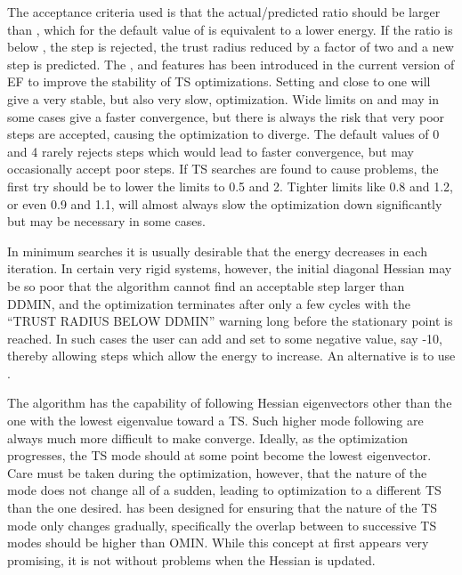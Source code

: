 \begin{enumerate}
The  acceptance criteria used is that the actual/predicted ratio should be
larger  than , which for the default   value of  is
equivalent to a lower  energy. If the ratio is below , the step is
rejected, the trust radius  reduced by a factor of two and a new step is
predicted. The ,  and   features has been
introduced in the current version of EF to improve the  stability of TS
optimizations. Setting  and  close to one will give a 
very stable, but also very slow, optimization. Wide limits on  and
 may  in some cases give a  faster convergence, but there is always
the risk that  very poor steps are accepted, causing the optimization to
diverge. The default  values of 0 and 4 rarely rejects steps which would lead
to faster convergence,  but may occasionally accept poor steps. If TS searches
are found to cause problems, the first try should be to lower the limits to 0.5
and 2. Tighter  limits like 0.8 and 1.2, or   even 0.9 and 1.1, will almost
always slow the  optimization down significantly but may be necessary in some
cases. 

In minimum  searches it is usually desirable that the energy decreases in each
iteration.  In certain very rigid systems, however, the initial diagonal
Hessian may be so  poor that the   algorithm cannot find an acceptable step
larger than DDMIN, and  the optimization terminates after only a few cycles
with the ``TRUST RADIUS  BELOW DDMIN'' warning long before the stationary point
is reached. In such cases  the user can add  and   
set to some negative value, say -10, thereby allowing  steps which allow the
energy to increase. An alternative is to use . 

The algorithm has the capability of following  Hessian eigenvectors other than
the one with the lowest eigenvalue toward a TS.  Such higher mode following are
always much more difficult to make converge.  Ideally, as the optimization
progresses, the TS mode should at some point  become the lowest eigenvector.
Care must be taken during the optimization,  however, that the   nature of the
mode does not change all of a sudden, leading to  optimization to a different
TS than the one desired.  has been designed for  ensuring that the
nature of the TS mode only changes gradually, specifically  the overlap between
to successive TS modes should be higher than OMIN. While  this concept at first
appears very promising, it is not without problems when  the Hessian is
updated. 


\end{enumerate}
